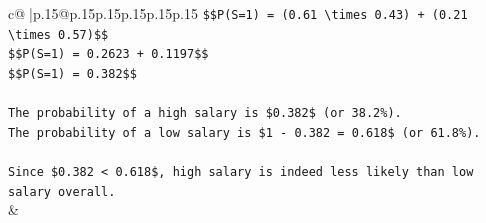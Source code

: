 \documentclass{article}
\begin{document}
{\begin{supertabular}{c@{$\;$}|p{.15\linewidth}@{}p{.15\linewidth}p{.15\linewidth}p{.15\linewidth}p{.15\linewidth}p{.15\linewidth}}
{{{\texttt{\$\$P(S=1) = (0.61 \textbackslash{}times 0.43) + (0.21 \textbackslash{}times 0.57)\$\$} \\
\texttt{\$\$P(S=1) = 0.2623 + 0.1197\$\$} \\
\texttt{\$\$P(S=1) = 0.382\$\$} \\
\\ 
\texttt{The probability of a high salary is \$0.382\$ (or 38.2\%).} \\
\texttt{The probability of a low salary is \$1 {-} 0.382 = 0.618\$ (or 61.8\%).} \\
\\ 
\texttt{Since \$0.382 < 0.618\$, high salary is indeed less likely than low salary overall.} \\
            }
        }
    }
    & \\ \\


\end{supertabular}}
\end{document}
